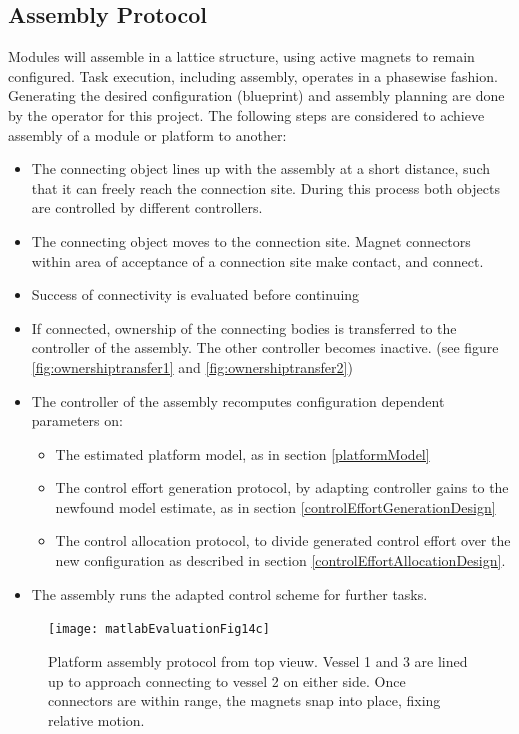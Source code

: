 \subsection{Assembly Protocol}
\label{assemblyProtocolDesign}
Modules will assemble in a lattice structure, using active magnets to remain configured. Task execution, including assembly, operates in a phasewise fashion. Generating the desired configuration (blueprint) and assembly planning are done by the operator for this project. 
The following steps are considered to achieve assembly of a module or platform to another:
\begin{itemize}
	\item The connecting object lines up with the assembly at a short distance, such that it can freely reach the connection site. During this process both objects are controlled by different controllers. 
	\item The connecting object moves to the connection site. Magnet connectors within area of acceptance of a connection site make contact, and connect. 
	\item Success of connectivity is evaluated before continuing
	\item If connected, ownership of the connecting bodies is transferred to the controller of the assembly. The other controller becomes inactive. (see figure \ref{fig:ownershiptransfer1} and \ref{fig:ownershiptransfer2})
	\item The controller of the assembly recomputes configuration dependent parameters on:
	\begin{itemize}
		\item The estimated platform model, as in section \ref{platformModel}
		\item The control effort generation protocol, by adapting controller gains to the newfound model estimate, as in section \ref{controlEffortGenerationDesign}
		\item   The control allocation protocol, to divide generated control effort over the new configuration as described in section \ref{controlEffortAllocationDesign}.
	\end{itemize}
	\item The assembly runs the adapted control scheme for further tasks.
\end{itemize}


\begin{figure}[H]
	\centering
	\texttt{[image: matlabEvaluationFig14c]}
	\caption{Platform assembly protocol from top vieuw. Vessel 1 and 3 are lined up to approach connecting to vessel 2 on either side. Once connectors are within range, the magnets snap into place, fixing relative motion.}
	\label{fig:matlabEvaluationFig14c}
\end{figure}




	